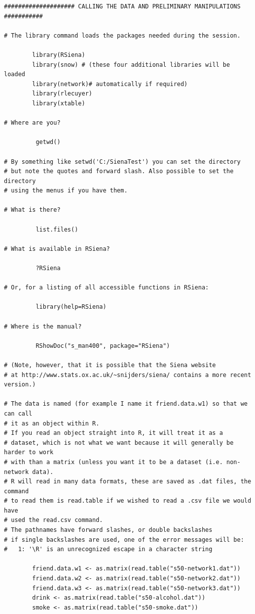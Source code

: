 \documentclass[a4paper,fleqn]{article}
\newcommand{\+}{\, + \,}
\newcommand{\R}{{\sf R }}
\begin{document}
{\begin{verbatim}
#################### CALLING THE DATA AND PRELIMINARY MANIPULATIONS ###########

# The library command loads the packages needed during the session.

        library(RSiena)
        library(snow) # (these four additional libraries will be loaded
        library(network)# automatically if required)
        library(rlecuyer)
        library(xtable)

# Where are you?

         getwd()

# By something like setwd('C:/SienaTest') you can set the directory
# but note the quotes and forward slash. Also possible to set the directory
# using the menus if you have them.

# What is there?

         list.files()

# What is available in RSiena?

         ?RSiena

# Or, for a listing of all accessible functions in RSiena:

         library(help=RSiena)

# Where is the manual?

         RShowDoc("s_man400", package="RSiena")

# (Note, however, that it is possible that the Siena website
# at http://www.stats.ox.ac.uk/~snijders/siena/ contains a more recent version.)

# The data is named (for example I name it friend.data.w1) so that we can call
# it as an object within R.
# If you read an object straight into R, it will treat it as a
# dataset, which is not what we want because it will generally be harder to work
# with than a matrix (unless you want it to be a dataset (i.e. non-network data).
# R will read in many data formats, these are saved as .dat files, the command
# to read them is read.table if we wished to read a .csv file we would have
# used the read.csv command.
# The pathnames have forward slashes, or double backslashes
# if single backslashes are used, one of the error messages will be:
#   1: '\R' is an unrecognized escape in a character string

        friend.data.w1 <- as.matrix(read.table("s50-network1.dat"))
        friend.data.w2 <- as.matrix(read.table("s50-network2.dat"))
        friend.data.w3 <- as.matrix(read.table("s50-network3.dat"))
        drink <- as.matrix(read.table("s50-alcohol.dat"))
        smoke <- as.matrix(read.table("s50-smoke.dat"))


\end{verbatim}}
\end{document}
